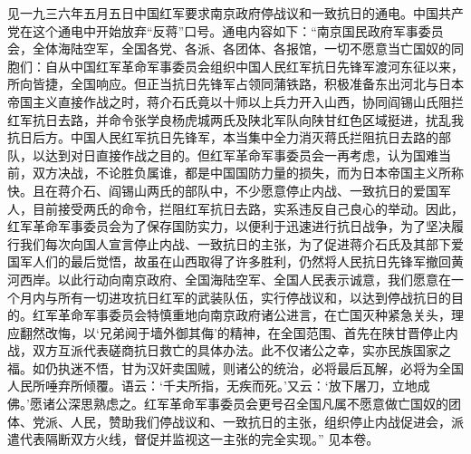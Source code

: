\begin{maonote}
见一九三六年五月五日中国红军要求南京政府停战议和一致抗日的通电。中国共产党在这个通电中开始放弃“反蒋”口号。通电内容如下：“南京国民政府军事委员会，全体海陆空军，全国各党、各派、各团体、各报馆，一切不愿意当亡国奴的同胞们：自从中国红军革命军事委员会组织中国人民红军抗日先锋军渡河东征以来，所向皆捷，全国响应。但正当抗日先锋军占领同蒲铁路，积极准备东出河北与日本帝国主义直接作战之时，蒋介石氏竟以十师以上兵力开入山西，协同阎锡山氏阻拦红军抗日去路，并命令张学良杨虎城两氏及陕北军队向陕甘红色区域挺进，扰乱我抗日后方。中国人民红军抗日先锋军，本当集中全力消灭蒋氏拦阻抗日去路的部队，以达到对日直接作战之目的。但红军革命军事委员会一再考虑，认为国难当前，双方决战，不论胜负属谁，都是中国国防力量的损失，而为日本帝国主义所称快。且在蒋介石、阎锡山两氏的部队中，不少愿意停止内战、一致抗日的爱国军人，目前接受两氏的命令，拦阻红军抗日去路，实系违反自己良心的举动。因此，红军革命军事委员会为了保存国防实力，以便利于迅速进行抗日战争，为了坚决履行我们每次向国人宣言停止内战、一致抗日的主张，为了促进蒋介石氏及其部下爱国军人们的最后觉悟，故虽在山西取得了许多胜利，仍然将人民抗日先锋军撤回黄河西岸。以此行动向南京政府、全国海陆空军、全国人民表示诚意，我们愿意在一个月内与所有一切进攻抗日红军的武装队伍，实行停战议和，以达到停战抗日的目的。红军革命军事委员会特慎重地向南京政府诸公进言，在亡国灭种紧急关头，理应翻然改悔，以‘兄弟阋于墙外御其侮’的精神，在全国范围、首先在陕甘晋停止内战，双方互派代表磋商抗日救亡的具体办法。此不仅诸公之幸，实亦民族国家之福。如仍执迷不悟，甘为汉奸卖国贼，则诸公的统治，必将最后瓦解，必将为全国人民所唾弃所倾覆。语云：‘千夫所指，无疾而死。’又云：‘放下屠刀，立地成佛。’愿诸公深思熟虑之。红军革命军事委员会更号召全国凡属不愿意做亡国奴的团体、党派、人民，赞助我们停战议和、一致抗日的主张，组织停止内战促进会，派遣代表隔断双方火线，督促并监视这一主张的完全实现。”
见本卷。

\end{maonote}
